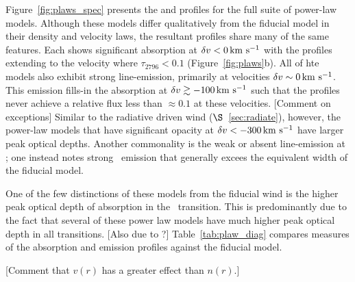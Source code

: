 \documentclass[12pt,preprint]{aastex}
\begin{document}
Figure~\ref{fig:plaws_spec} presents the  and 
profiles for the full suite of power-law models.  Although these
models differ qualitatively from the fiducial model in their density
and velocity laws, the resultant profiles share many of the same
features.  Each shows significant absorption at $\delta v < 0 \, {\rm km~s^{-1}}$ with
the profiles extending to the velocity where $\tau_{2796} < 0.1$
(Figure~\ref{fig:plaws}b).  All of hte models also exhibit strong
line-emission, primarily at velocities $\delta v \sim 0 \, {\rm km~s^{-1}}$.  
This emission fills-in the  absorption at $\delta v \gtrsim
-100 \, {\rm km~s^{-1}}$ such that the profiles never achieve a relative flux less
than $\approx 0.1$ at these velocities.  [Comment on exceptions]
Similar to the radiative driven wind ($\S$~\ref{sec:radiate}),
however, the power-law models that have significant opacity at $\delta v <
-300 \, {\rm km~s^{-1}}$ have larger peak optical depths.  Another commonality is
the weak or absent line-emission at \feiia; one instead notes strong
\feiic\ emission that generally excees the equivalent width of the
fiducial model.  

One of the few distinctions of these models from the fiducial wind is
the higher peak optical depth of absorption in the \feiib\
transition.  This is predominantly due to the fact that several of
these power law models have much higher peak optical depth in all
transitions.  [Also due to ?]
Table~\ref{tab:plaw_diag} compares measures of the absorption and
emission profiles against the fiducial model.

[Comment that $v(r)$ has a greater effect than $n(r)$.]
\end{document}
